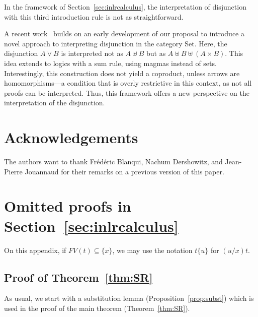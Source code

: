 \documentclass[screen, sigconf,authorversion,nonacm]{acmart}
\theoremstyle{acmdefinition}
\numberwithin{equation}{section}
\begin{document}
In the framework of Section~\ref{sec:inlrcalculus}, the interpretation
of disjunction with this third introduction rule is not as
straightforward.

A recent work~\cite{DiazcaroMalherbe24} builds on an early development
of our proposal to introduce a novel approach to interpreting
disjunction in the category Set. Here, the disjunction $A \vee B$ is
interpreted not as $A\uplus B$ but as $A
\uplus B \uplus (A \times B)$. This idea extends to logics with a sum
rule, using magmas instead of sets.  Interestingly, this construction
does not yield a coproduct, unless arrows are homomorphisms---a
condition that is overly restrictive in this context, as not all
proofs can be interpreted. Thus, this framework offers a new
perspective on the interpretation of the disjunction.

\section*{Acknowledgements}

The authors want to thank Fr\'ed\'eric Blanqui, Nachum Dershowitz, and
Jean-Pierre Jouannaud for their remarks on a previous version of this
paper.




\balance


\appendix
\onecolumn

\section{Omitted proofs in Section~\ref{sec:inlrcalculus}}
On this appendix, if $FV(t) \subseteq \{x\}$, we may use the notation $t\{u\}$ for $(u/x)t$.

\subsection{Proof of Theorem~\ref{thm:SR}}
As usual, we start with a substitution lemma
(Proposition~\ref{prop:subst}) which is used in
the proof of the main theorem
(Theorem~\ref{thm:SR}).
\end{document}
